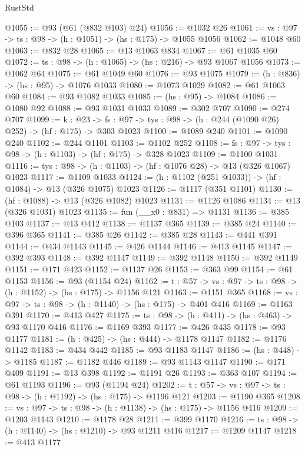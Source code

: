 \begin{lexlean}{RustStd}
\begin{coremodule}
@1055 := @93 (@61 (@832 @103) @24)
@1056 := @1032 @26
@1061 := {vs : @97} -> {ts : @98} -> (h : @1051) -> (hs : @175) -> @1055 @1056
@1062 := @1048 @60
@1063 := @832 @28
@1065 := @13 @1063 @834
@1067 := @61 @1035 @60
@1072 := {ts : @98} -> (h : @1065) -> (hs : @216) -> @93 @1067 @1056
@1073 := @1062 @64
@1075 := @61 @1049 @60
@1076 := @93 @1075
@1079 := (h : @836) -> (hs : @95) -> @1076 @1033
@1080 := @1073 @1029
@1082 := @61 @1063 @60
@1084 := @93 @1082 @1033
@1085 := (hs : @95) -> @1084
@1086 := @1080 @92
@1088 := @93 @1031 @1033
@1089 := @302 @707
@1090 := @274 @707
@1099 := {k : @23} ->
  {fs : @97} -> {tys : @98} -> (h : @244 (@1090 @26) @252) -> (hf : @175) -> @303 @1023
@1100 := @1089 @240
@1101 := @1090 @240
@1102 := @244 @1101
@1103 := @1102 @252
@1108 := {fs : @97} -> {tys : @98} -> (h : @1103) -> (hf : @175) -> @328 @1023
@1109 := @1100 @1031
@1116 := {tys : @98} -> (h : @1103) -> (hf : @1076 @28) -> @13 (@326 @1067) @1023
@1117 := @1109 @1033
@1124 := (h : @1102 (@251 @1033)) -> (hf : @1084) -> @13 (@326 @1075) @1023
@1126 := @1117 (@351 @1101)
@1130 := (hf : @1088) -> @13 (@326 @1082) @1023
@1131 := @1126 @1086
@1134 := @13 (@326 @1031) @1023
@1135 := fun (__x0 : @831) => @1131
@1136 := @385 @103
@1137 := @13 @412
@1138 := @1137 @365
@1139 := @385 @24
@1140 := @396 @365
@1141 := @385 @26
@1142 := @385 @28
@1143 := @441 @391
@1144 := @434 @1143
@1145 := @426 @1144
@1146 := @413 @1145
@1147 := @392 @393
@1148 := @392 @1147
@1149 := @392 @1148
@1150 := @392 @1149
@1151 := @171 @423
@1152 := @1137 @26
@1153 := @363 @99
@1154 := @61 @1153
@1156 := @93 (@1154 @24)
@1162 := {t : @57} -> {vs : @97} -> {ts : @98} -> (h : @1152) -> (hs : @175) -> @1156 @121
@1163 := @1151 @365
@1168 := {vs : @97} -> {ts : @98} -> (h : @1140) -> (hs : @175) -> @401 @416
@1169 := @1163 @391
@1170 := @413 @427
@1175 := {ts : @98} -> (h : @411) -> (hs : @463) -> @93 @1170 @416
@1176 := @1169 @393
@1177 := @426 @435
@1178 := @93 @1177
@1181 := (h : @425) -> (hs : @444) -> @1178 @1147
@1182 := @1176 @1142
@1183 := @434 @442
@1185 := @93 @1183 @1147
@1186 := (hs : @448) -> @1185
@1187 := @1182 @446
@1189 := @93 @1143 @1147
@1190 := @171 @409
@1191 := @13 @398
@1192 := @1191 @26
@1193 := @363 @107
@1194 := @61 @1193
@1196 := @93 (@1194 @24)
@1202 := {t : @57} -> {vs : @97} -> {ts : @98} -> (h : @1192) -> (hs : @175) -> @1196 @121
@1203 := @1190 @365
@1208 := {vs : @97} -> {ts : @98} -> (h : @1138) -> (hs : @175) -> @1156 @416
@1209 := @1203 @1143
@1210 := @1178 @28
@1211 := @399 @1170
@1216 := {ts : @98} -> (h : @1140) -> (hs : @1210) -> @93 @1211 @416
@1217 := @1209 @1147
@1218 := @413 @1177

\end{coremodule}
\end{lexlean}
